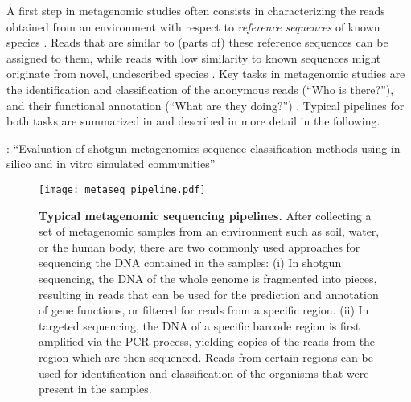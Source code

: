 A first step in metagenomic studies often consists in characterizing the reads obtained from an environment
with respect to \emph{reference sequences} of known species \cite{Hug2016}.
Reads that are similar to (parts of) these reference sequences can be assigned to them,
while reads with low similarity to known sequences might originate from novel, undescribed species \cite{Temperton2012}.
Key tasks in metagenomic studies are the identification and classification of the anonymous reads (``Who is there?''),
and their functional annotation (``What are they doing?'') \cite{Desai2012,Lindgreen2016}.
Typical pipelines for both tasks are summarized in 
and described in more detail in the following.

 \cite{Peabody2015}: ``Evaluation of shotgun metagenomics sequence classification methods using in silico and in vitro simulated communities''

\begin{figure}[hpbt!]
    \centering
    \texttt{[image: metaseq\_pipeline.pdf]}
    \caption[Typical metagenomic sequencing pipelines]{
        \textbf{Typical metagenomic sequencing pipelines.}
        After collecting a set of metagenomic samples from an environment such as soil, water, or the human body,
        there are two commonly used approaches for sequencing the DNA contained in the samples:
        (i) In shotgun sequencing, the DNA of the whole genome is fragmented into pieces,
        resulting in reads that can be used for the prediction and annotation of gene functions,
        or filtered for reads from a specific region.
        (ii) In targeted sequencing, the DNA of a specific barcode region is first amplified via the PCR process,
        yielding copies of the reads from the region which are then sequenced.
        Reads from certain regions can be used for identification and classification
        of the organisms that were present in the samples.
    }
    \label{fig:metaseq_pipeline}
\end{figure}

